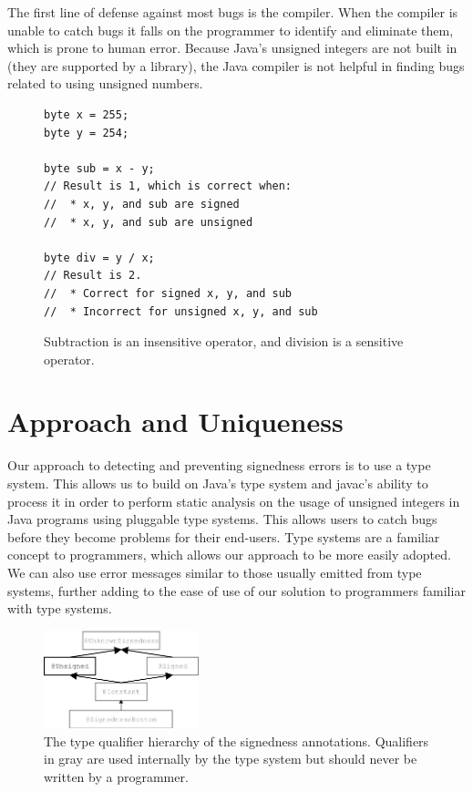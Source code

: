 \documentclass{sig-alternate-05-2015}
\begin{document}
The first line of defense against most bugs is the compiler. When the
compiler is unable to catch bugs it falls on the programmer to identify and
eliminate them, which is prone to human error. Because Java's unsigned
integers are not built in (they are supported by a library), the Java
compiler is not helpful in finding bugs related to using unsigned
numbers.

\begin{figure}
\smaller
\begin{lstlisting}
byte x = 255;
byte y = 254;

byte sub = x - y;
// Result is 1, which is correct when:
//  * x, y, and sub are signed
//  * x, y, and sub are unsigned

byte div = y / x;
// Result is 2.
//  * Correct for signed x, y, and sub
//  * Incorrect for unsigned x, y, and sub
\end{lstlisting}
\caption{Subtraction is an insensitive operator, and
  division is a sensitive operator.}
\label{fig:operators}
\end{figure}


\section{Approach and Uniqueness}

Our approach to detecting and preventing signedness errors is to use a type system. This allows us to build on Java's type system and javac's ability to process it in order to perform static analysis on the usage of unsigned integers in Java programs using pluggable type systems. This allows users to catch bugs before they become problems for their end-users. Type systems are a familiar concept to programmers, which allows our approach to be more easily adopted. We can also use error messages similar to those usually emitted from type systems, further adding to the ease of use of our solution to programmers familiar with type systems.

\begin{figure}
    \centering
    \includegraphics[width=0.4\textwidth]{signedness}
    \caption{The type qualifier hierarchy of the signedness annotations.
Qualifiers in gray are used internally by the type system but should never be written by a programmer.}
    \label{fig:my_label}
\end{figure}
\end{document}
